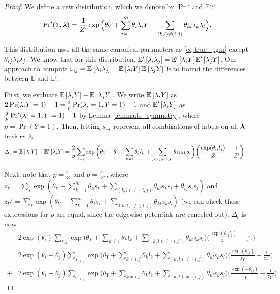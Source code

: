 \begin{proof}
We define a new distribution, which we denote by $\Pr'$ and $\mathbb{E}'$:
\begin{align}
    \mathrm{Pr}'(Y, \bm{\lambda}) = \frac{1}{Z'} \exp \Big(\theta_Y + \sum_{i = 1}^m \theta_i \lambda_i Y + \sum_{(k, l) \neq (i,j)} \theta_{kl} \lambda_k \lambda_l \Big).
    \label{eq:wrong_pgm}
\end{align}

This distribution uses all the same canonical parameters as \eqref{eq:true_pgm} except $\theta_{ij} \lambda_i \lambda_j$. We know that for this distribution, $\mathbb{E}'_{}\left[\lambda_i \lambda_j\right] = \mathbb{E}'_{}\left[\lambda_i Y\right] \mathbb{E}'_{}\left[\lambda_j Y\right]$. Our approach to compute $\varepsilon_{ij} = \mathbb{E}_{}\left[\lambda_i \lambda_j\right] - \mathbb{E}_{}\left[\lambda_i Y\right] \mathbb{E}_{}\left[\lambda_j Y\right]$ is to bound the differences between $\mathbb{E}$ and $\mathbb{E}'$. 

First, we evaluate $\mathbb{E}_{}\left[\lambda_i Y\right] - \mathbb{E}_{}\left[\lambda_j Y\right]$. We write $\mathbb{E}_{}\left[\lambda_i Y\right]$ as $2\Pr(\lambda_i Y = 1) - 1 = \frac{2}{p} \Pr(\lambda_i = 1, Y = 1) - 1$ and $\mathbb{E}'_{}\left[\lambda_i Y\right]$ as $\frac{2}{p} \Pr'(\lambda_i = 1, Y = 1) - 1$  by Lemma \ref{lemma:fs_symmetry}, where $p = \Pr(Y = 1).$ Then, letting $s_{-i}$ represent all combinations of labels on all $\bm{\lambda}$ besides $\lambda_i$,
\begin{align}
    \Delta_i &= \mathbb{E}_{}\left[\lambda_i Y\right] - \mathbb{E}'_{}\left[\lambda_i Y\right] = \frac{2}{p} \sum_{s_{-i}} \exp \bigg(\theta_Y + \theta_i + \sum_{k \neq i} \theta_k l_k + \sum_{(k, l) \neq (i, j)} \theta_{kl} s_k s_l \bigg) \left(\frac{\exp(\theta_{ij} l_j)}{Z} - \frac{1}{Z'} \right)
\end{align}

Next, note that $p = \frac{z_Y}{Z}$ and $p = \frac{z_Y'}{Z'}$, where $z_Y = \sum_{s} \exp(\theta_Y + \sum_{k = 1}^m \theta_k s_k + \sum_{(k, l) \neq (i, j)} \theta_{kl} s_k s_l + \theta_{ij} s_i s_j)$ and  $z_Y' = \sum_s \exp(\theta_Y + \sum_{k = 1}^m \theta_i s_i + \sum_{(k, l) \neq (i, j)} \theta_{kl} s_k s_l)$ (we can check these expressions for $p$ are equal, since the edgewise potentials are canceled out). $\Delta_i$ is now 
\begin{align}
     &2 \exp(\theta_i) \sum_{s_{-i}} \exp \bigg(\theta_Y + \sum_{k \neq i} \theta_k l_k + \sum_{(k, l) \neq (i, j)} \theta_{kl} s_k s_l\bigg) \bigg(\frac{\exp(\theta_{ij} l_j)}{z_Y} - \frac{1}{z_Y'} \bigg) \\
     = &2 \exp(\theta_i + \theta_j) \sum_{s_{-i, j}} \exp \bigg(\theta_Y + \sum_{k \neq i, j} \theta_k l_k + \sum_{(k, l) \neq (i, j)} \theta_{kl} s_k s_l\bigg) \bigg(\frac{\exp(\theta_{ij})}{z_Y} - \frac{1}{z_Y'} \bigg) \\
     + &2 \exp(\theta_i - \theta_j) \sum_{s_{-i, j}} \exp \bigg(\theta_Y + \sum_{k \neq i, j} \theta_k l_k + \sum_{(k, l) \neq (i, j)} \theta_{kl} s_k s_l\bigg) \bigg(\frac{\exp(-\theta_{ij})}{z_Y} - \frac{1}{z_Y'} \bigg)
\end{align}


\end{proof}
